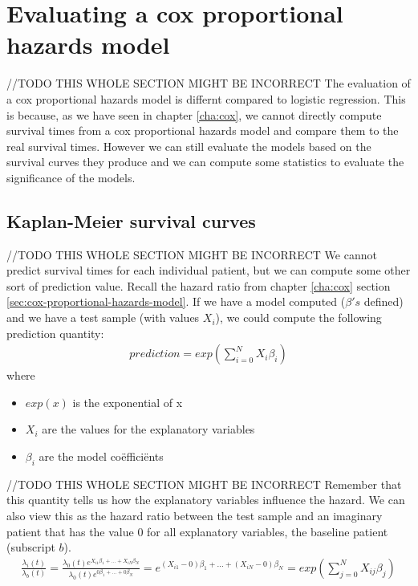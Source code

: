 \section{Evaluating a cox proportional hazards model}
\label{sec:evaluation-coxph}
//TODO THIS WHOLE SECTION MIGHT BE INCORRECT
The evaluation of a cox proportional hazards model is differnt compared to logistic regression. This is because, as we have seen in chapter \ref{cha:cox}, we cannot directly compute survival times from a cox proportional hazards model and compare them to the real survival times. However we can still evaluate the models based on the survival curves they produce and we can compute some statistics to evaluate the significance of the models.

\subsection{Kaplan-Meier survival curves}
//TODO THIS WHOLE SECTION MIGHT BE INCORRECT
We cannot predict survival times for each individual patient, but we can compute some other sort of prediction value. Recall the hazard ratio from chapter \ref{cha:cox} section \ref{sec:cox-proportional-hazards-model}. If we have a model computed ($\beta's$ defined) and we have a test sample (with values $X_{i}$), we could compute the following prediction quantity:
\begin{equation}
\begin{split}
prediction = exp(\sum_{i=0}^{N}X_{i}\beta_{i})
\end{split}
\end{equation}
where
\begin{itemize}
	\item $exp(x)$ is the exponential of x
	\item $X_{i}$ are the values for the explanatory variables
	\item $\beta_{i}$ are the model co\"effici\"ents
\end{itemize}
//TODO THIS WHOLE SECTION MIGHT BE INCORRECT
 Remember that this quantity tells us how the explanatory variables influence the hazard. We can also view this as the hazard ratio between the test sample and an imaginary patient that has the value $0$ for all explanatory variables, the baseline patient (subscript $b$).
 \begin{equation}
 \begin{split}
 \frac{\lambda_{i}(t)}{\lambda_{b}(t)} 
 = \frac{\lambda_{0}(t)e^{X_{i1}\beta_{1} + ... + X_{iN}\beta_{N}}}{\lambda_{0}(t)e^{0\beta_{1} + ... + 0\beta_{N}}}
 = e^{(X_{i1}-0)\beta_{1} + ... + (X_{iN}-0)\beta_{N}} = exp(\sum_{j=0}^{N}X_{ij}\beta_{j})
 \end{split}
 \end{equation}
